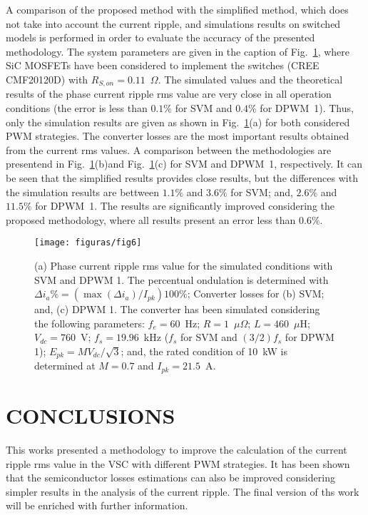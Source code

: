 \documentclass[10pt, onecolumn,conference]{IEEEtran}
\begin{document}
A comparison of the proposed method with the simplified method, which does not take into account the current ripple, and simulations results on switched models is performed in order to evaluate the accuracy of the presented methodology. The system parameters are given in the caption of Fig.~\ref{fig6}, where SiC MOSFETs have been considered to implement the switches (CREE CMF20120D) with $R_{S,on}\!=\!0.11$~$\Omega$. The simulated values and the theoretical results of the phase current ripple rms value are very close  in all operation conditions (the error is less than $0.1\%$ for SVM and $0.4\%$ for DPWM~1). Thus, only the simulation results are given as shown in Fig.~\ref{fig6}(a) for both considered PWM strategies. The converter losses are the most important results obtained from the current rms values. A comparison between the methodologies are presentend in Fig.~\ref{fig6}(b)and Fig.~\ref{fig6}(c) for SVM and DPWM~1, respectively. It can be seen that the simplified results provides close results, but the differences with the simulation results are bettween $1.1\%$ and $3.6\%$ for SVM; and, $2.6\%$ and $11.5\%$ for DPWM~1. The results are significantly improved considering the proposed methodology, where all results present an error less than $0.6\%$.
%
\begin{figure}[tp!]
	\centering
	\texttt{[image: figuras/fig6]}
	\caption{(a) Phase current ripple rms value for the simulated conditions with SVM and DPWM 1. The percentual ondulation is determined with $\Delta i_a \%\!=\!(\max(\Delta i_a)/I_{pk}) 100\%$; Converter losses for (b) SVM; and, (c) DPWM 1. The converter has been simulated considering the following parameters: $f_e\!=\!60$~Hz; $R\!=\!1$~$\mu\Omega$;  $L\!=\!460$~$\mu$H; $V_{dc}\!=\!760$~V; $f_s\!=\!19.96$~kHz ($f_s$ for SVM and $(3/2)f_s$ for DPWM 1); $E_{pk}\!=\!MV_{dc}/\sqrt{3}$; and, the rated condition of 10~kW is determined at $M\!=\!0.7$ and $I_{pk}\!=\!21.5$~A.}
	\label{fig6}
\end{figure}

\section{\MakeUppercase{Conclusions}}

{This works presented a methodology to improve the calculation of the current ripple rms value in the VSC with different PWM strategies. It has been shown that the semiconductor losses estimations  can also be improved considering simpler results in the analysis of the current ripple.  The final version of ths work will be enriched with further information. }
\end{document}
